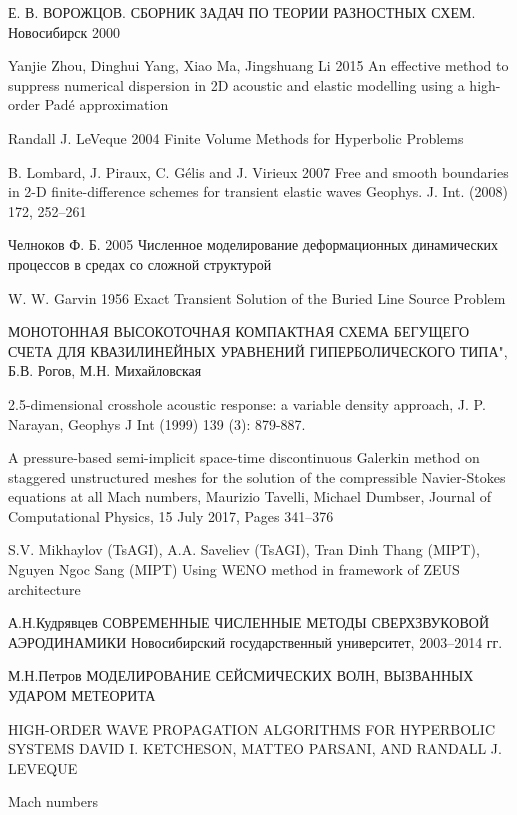 \documentclass{article}
\begin{document}
\begin{thebibliography}{99}

 Е. В. ВОРОЖЦОВ. СБОРНИК ЗАДАЧ ПО ТЕОРИИ РАЗНОСТНЫХ СХЕМ. Новосибирск 2000

 Yanjie Zhou, Dinghui Yang, Xiao Ma, Jingshuang Li 2015 An effective method to suppress numerical dispersion in 2D acoustic and elastic modelling using a high-order Padé approximation 

 Randall J. LeVeque 2004 Finite Volume Methods for Hyperbolic Problems

 B. Lombard, J. Piraux, C. Gélis and J. Virieux 2007 Free and smooth boundaries in 2-D finite-difference schemes for transient elastic waves Geophys. J. Int. (2008) 172, 252–261

 Челноков Ф. Б. 2005 Численное моделирование деформационных динамических процессов в средах со сложной структурой

 W. W. Garvin 1956 Exact Transient Solution of the Buried Line Source Problem

 МОНОТОННАЯ ВЫСОКОТОЧНАЯ КОМПАКТНАЯ СХЕМА БЕГУЩЕГО СЧЕТА ДЛЯ КВАЗИЛИНЕЙНЫХ УРАВНЕНИЙ ГИПЕРБОЛИЧЕСКОГО ТИПА", Б.В. Рогов, М.Н. Михайловская

 2.5-dimensional crosshole acoustic response: a variable density approach, J. P. Narayan, Geophys J Int (1999) 139 (3): 879-887.

 A pressure-based semi-implicit space-time discontinuous Galerkin method on staggered unstructured meshes for the solution of the compressible Navier-Stokes equations at all Mach numbers, Maurizio Tavelli, Michael Dumbser, Journal of Computational Physics, 15 July 2017, Pages 341–376

 S.V. Mikhaylov (TsAGI), A.A. Saveliev (TsAGI), Tran Dinh Thang (MIPT), Nguyen Ngoc Sang (MIPT)
Using WENO method in framework of ZEUS architecture

 А.Н.Кудрявцев СОВРЕМЕННЫЕ ЧИСЛЕННЫЕ МЕТОДЫ
СВЕРХЗВУКОВОЙ АЭРОДИНАМИКИ Новосибирский государственный университет, 2003–2014 гг.

  М.Н.Петров МОДЕЛИРОВАНИЕ СЕЙСМИЧЕСКИХ ВОЛН, ВЫЗВАННЫХ УДАРОМ МЕТЕОРИТА

 HIGH-ORDER WAVE PROPAGATION ALGORITHMS FOR HYPERBOLIC SYSTEMS
DAVID I. KETCHESON, MATTEO PARSANI, AND RANDALL J. LEVEQUE

Mach numbers
\end{thebibliography}
\end{document}
